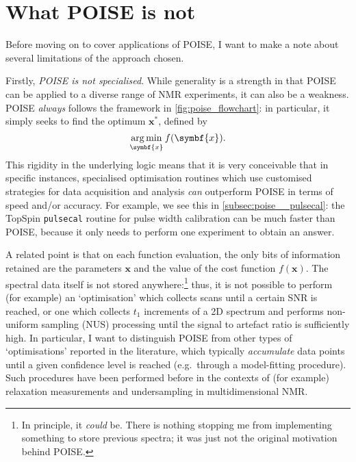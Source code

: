 \section{What POISE is not}
\label{sec:poise__notpoise}

Before moving on to cover applications of POISE, I want to make a note about several limitations of the approach chosen. 

Firstly, \textit{POISE is not specialised}.
While generality is a strength in that POISE can be applied to a diverse range of NMR experiments, it can also be a weakness.
POISE \textit{always} follows the framework in \cref{fig:poise_flowchart}: in particular, it simply seeks to find the optimum $\symbf{x}^*$, defined by
\begin{equation}
    \label{eq:poise_argmin}
    \argmin_{\symbf{x}} f(\symbf{x}).
\end{equation}
This rigidity in the underlying logic means that it is very conceivable that in specific instances, specialised optimisation routines which use customised strategies for data acquisition and analysis \textit{can} outperform POISE in terms of speed and/or accuracy.
For example, we see this in \cref{subsec:poise__pulsecal}: the TopSpin \texttt{pulsecal} routine for pulse width calibration can be much faster than POISE, because it only needs to perform one experiment to obtain an answer.

A related point is that on each function evaluation, the only bits of information retained are the parameters $\symbf{x}$ and the value of the cost function $f(\symbf{x})$.
The spectral data itself is not stored anywhere:\footnote{In principle, it \textit{could} be. There is nothing stopping me from implementing something to store previous spectra; it was just not the original motivation behind POISE.} thus, it is not possible to perform (for example) an `optimisation' which collects scans until a certain SNR is reached, or one which collects $t_1$ increments of a 2D spectrum and performs non-uniform sampling (NUS) processing until the signal to artefact ratio is sufficiently high.
In particular, I want to distinguish POISE from other types of `optimisations' reported in the literature, which typically \textit{accumulate} data points until a given confidence level is reached (e.g.\ through a model-fitting procedure).
Such procedures have been performed before in the contexts of (for example) relaxation measurements\autocite{Song2018JMR,Tang2019SR} and undersampling in multidimensional NMR\autocite{Eghbalnia2005JACS,Hansen2016ACIE,BrukerSmartDriveNMR}.

